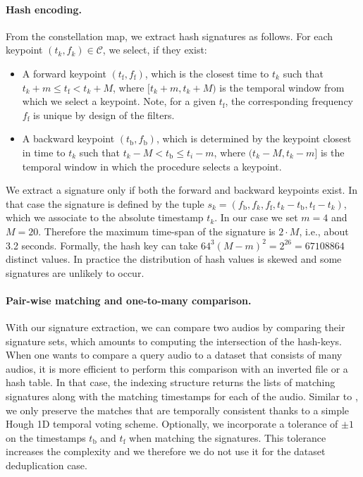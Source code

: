 \paragraph{Hash encoding. } 
From the constellation map, we extract hash signatures as follows. For each keypoint $(t_k, f_k) \in \mathcal C$, we select, if they exist:
\begin{itemize}
\item A forward keypoint $(t_\mathrm{f},f_\mathrm{f})$, which is the closest time to $t_k$ such that $t_k+m \leq t_\mathrm{f} < t_k+M$, where $[t_k+m,t_k+M)$ is the temporal window from which we select a keypoint. Note, for a given $t_\mathrm{f}$, the corresponding frequency $f_\mathrm{f}$ is unique by design of the filters. 
\item A backward keypoint $(t_\mathrm{b},f_\mathrm{b})$, which is determined by the keypoint closest in time to $t_k$ such that $t_k-M < t_\mathrm{b} \leq t_i-m$, where $(t_k-M,t_k-m]$ is the temporal window in which the procedure selects a keypoint. 
\end{itemize}

We extract a signature only if both the forward and backward keypoints exist. In that case the signature is defined by the tuple $s_k=(f_\mathrm{b},f_k,f_\mathrm{f},t_k-t_\mathrm{b},t_\mathrm{f}-t_k)$, which we associate to the absolute timestamp $t_k$. 
In our case we set $m=4$ and $M=20$. Therefore the maximum time-span of the signature is $2\cdot M$, i.e., about 3.2 seconds. 
Formally, the hash key can take $64^3 (M-m)^2 = 2^{26} = 67108864$ distinct values. In practice the distribution of hash values is skewed and some signatures are unlikely to occur. 
 

\paragraph{Pair-wise matching and one-to-many comparison. } With our signature extraction, we can compare two audios by comparing their signature sets, which amounts to computing the intersection of the hash-keys. When one wants to compare a query audio to a dataset that consists of many audios, it is more efficient to perform this comparison with an inverted file or a hash table. In that case, the indexing structure returns the lists of matching signatures along with the matching timestamps for each of the audio. Similar to \cite{wang2003industrial}, we only preserve the matches that are temporally consistent thanks to a simple Hough 1D temporal voting scheme. Optionally, we incorporate a tolerance of $\pm 1$ on the timestamps $t_\mathrm{b}$ and $t_\mathrm{f}$ when matching the signatures. This tolerance increases the complexity and we therefore we do not use it for the dataset deduplication case. 

